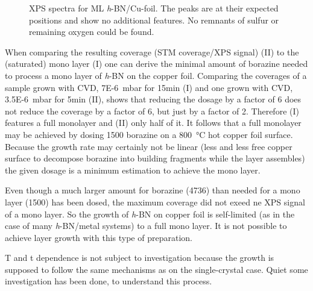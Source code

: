 \begin{figure}[ht]
{	}
	\caption{XPS spectra for ML \textit{h}-BN/Cu-foil. The peaks are at their expected positions\cite{kidambi_situ_2014} and show no additional features. No remnants of sulfur or remaining oxygen could be found.}
	\label{fig:xps-self-grown}
\end{figure}

When comparing the resulting coverage (STM coverage/XPS signal) (II) to the (saturated) mono layer (I) one can derive the minimal amount of borazine needed to process a mono layer of \textit{h}-BN on the copper foil. Comparing the coverages of a sample grown with CVD, \SI{7E-6}{\milli \bar} for 15min (I) and one grown with CVD, \SI{3.5E-6}{\milli \bar} for 5min (II), shows that reducing the dosage by a factor of 6 does not reduce the coverage by a factor of 6, but just by a factor of 2. Therefore (I) features a full monolayer and (II) only half of it. It follows that a full monolayer may be achieved by dosing \SI{1500}{\langmuir} borazine on a \SI{800}{\degreeCelsius} hot copper foil surface. 
Because the growth rate may certainly not be linear (less and less free copper surface to decompose borazine into building fragments while the layer assembles) the given dosage is a minimum estimation to achieve the mono layer.

Even though a much larger amount for borazine (\SI{4736}{\langmuir}) than needed for a mono layer (\SI{1500}{\langmuir}) has been dosed, the maximum coverage did not exeed ne XPS signal of a mono layer. So the growth of \textit{h}-BN on copper foil is self-limited (as in the case of many \textit{h}-BN/metal systems) to a full mono layer. It is not possible to achieve layer growth with this type of preparation.

T and t dependence is not subject to investigation because the growth is supposed to follow the same mechanisms as on the single-crystal case. Quiet some investigation has been done, \cite{orlando_epitaxial_2012,preobrajenski_monolayer_2007-1} to understand this process.

